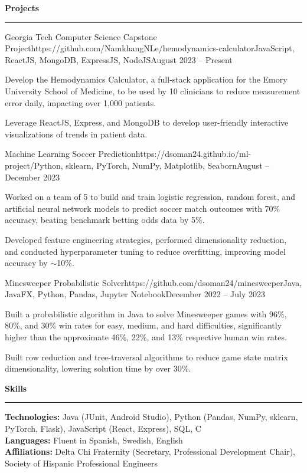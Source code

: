 \documentclass{article}
\newcommand{\horizontal}{\vspace{2pt}\hrule}
\newcommand{\sectitle}[1]{\vspace{3pt} \textbf{\large #1} \horizontal}
\newcommand{\skill}[2]{\textbf{#1:} #2}
\begin{document}
\begin{flushleft}
\sectitle{Projects}

    \vspace{3pt}

    \begin{project}{Georgia Tech Computer Science Capstone Project}{https://github.com/NamkhangNLe/hemodynamics-calculator}{JavaScript, ReactJS, MongoDB, ExpressJS, NodeJS}{August 2023 -- Present}
        \item Develop the Hemodynamics Calculator, a full-stack application for the Emory University School of Medicine, to be used by 10 clinicians to reduce measurement error daily, impacting over 1,000 patients.
        \item Leverage ReactJS, Express, and MongoDB to develop user-friendly interactive visualizations of trends in patient data.
    \end{project}

    \begin{project}{Machine Learning Soccer Prediction}{https://dsoman24.github.io/ml-project/}{Python, sklearn, PyTorch, NumPy, Matplotlib, Seaborn}{August -- December 2023}
        \item Worked on a team of 5 to build and train logistic regression, random forest, and artificial neural network models to predict soccer match outcomes with 70\% accuracy, beating benchmark betting odds data by 5\%.
        \item Developed feature engineering strategies, performed dimensionality reduction, and conducted hyperparameter tuning to reduce overfitting, improving model accuracy by $\sim$10\%.
    \end{project}

    \begin{project}{Minesweeper Probabilistic Solver}{https://github.com/dsoman24/minesweeper}{Java, JavaFX, Python, Pandas, Jupyter Notebook}{December 2022 -- July 2023}
        \item Built a probabilistic algorithm in Java to solve Minesweeper games with 96\%, 80\%, and 30\% win rates for easy, medium, and hard difficulties, significantly higher than the approximate 46\%, 22\%, and 13\% respective human win rates.
        \item Built row reduction and tree-traversal algorithms to reduce game state matrix dimensionality, lowering solution time by over 30\%.
    \end{project}

\sectitle{Skills}

    \vspace{3pt}
    \skill{Technologies}{Java (JUnit, Android Studio), Python (Pandas, NumPy, sklearn, PyTorch, Flask), JavaScript (React, Express), SQL, C} \\
    \skill{Languages}{Fluent in Spanish, Swedish, English} \\
    \skill{Affiliations}{Delta Chi Fraternity (Secretary, Professional Development Chair), Society of Hispanic Professional Engineers}

\end{flushleft}
\end{document}
